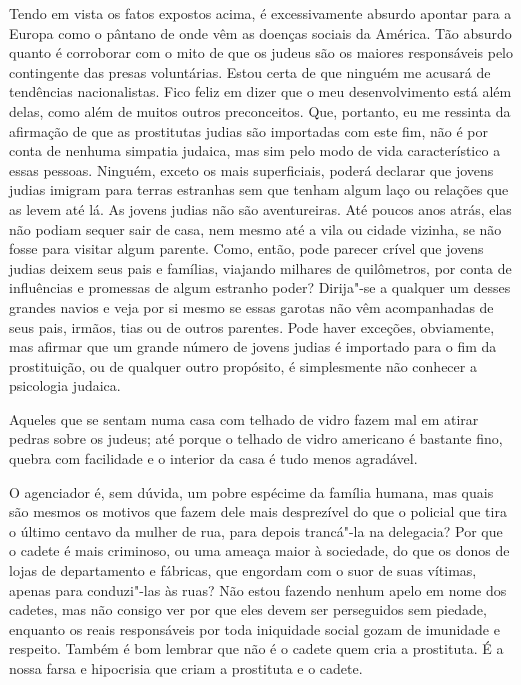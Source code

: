 Tendo em vista os fatos expostos acima, é excessivamente absurdo apontar
para a Europa como o pântano de onde vêm as doenças sociais da América.
Tão absurdo quanto é corroborar com o mito de que os judeus são os
maiores responsáveis pelo contingente das presas voluntárias. Estou
certa de que ninguém me acusará de tendências nacionalistas. Fico feliz
em dizer que o meu desenvolvimento está além delas, como além de muitos
outros preconceitos. Que, portanto, eu me ressinta da afirmação de que
as prostitutas judias são importadas com este fim, não é por conta de
nenhuma simpatia judaica, mas sim pelo modo de vida característico a
essas pessoas. Ninguém, exceto os mais superficiais, poderá declarar que
jovens judias imigram para terras estranhas sem que tenham algum laço ou
relações que as levem até lá. As jovens judias não são aventureiras. Até
poucos anos atrás, elas não podiam sequer sair de casa, nem mesmo até a
vila ou cidade vizinha, se não fosse para visitar algum parente. Como,
então, pode parecer crível que jovens judias deixem seus pais e
famílias, viajando milhares de quilômetros, por conta de influências e
promessas de algum estranho poder? Dirija"-se a qualquer um desses
grandes navios e veja por si mesmo se essas garotas não vêm acompanhadas
de seus pais, irmãos, tias ou de outros parentes. Pode haver exceções,
obviamente, mas afirmar que um grande número de jovens judias é
importado para o fim da prostituição, ou de qualquer outro propósito, é
simplesmente não conhecer a psicologia judaica.

Aqueles que se sentam numa casa com telhado de vidro fazem mal em atirar
pedras sobre os judeus; até porque o telhado de vidro americano é
bastante fino, quebra com facilidade e o interior da casa é tudo menos
agradável.

O agenciador é, sem dúvida, um pobre espécime da família humana, mas
quais são mesmos os motivos que fazem dele mais desprezível do que o
policial que tira o último centavo da mulher de rua, para depois
trancá"-la na delegacia? Por que o cadete é mais criminoso, ou uma ameaça
maior à sociedade, do que os donos de lojas de departamento e fábricas,
que engordam com o suor de suas vítimas, apenas para conduzi"-las às
ruas? Não estou fazendo nenhum apelo em nome dos cadetes, mas não
consigo ver por que eles devem ser perseguidos sem piedade, enquanto os
reais responsáveis por toda iniquidade social gozam de imunidade e
respeito. Também é bom lembrar que não é o cadete quem cria a
prostituta. É a nossa farsa e hipocrisia que criam a
prostituta e o cadete.

